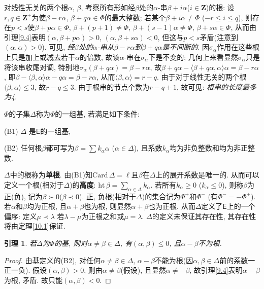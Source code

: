 \documentclass{ctexart}%
\newtheorem{lemma}{引理}
\theoremstyle{definition}
\theoremstyle{remark}
\begin{document}
对线性无关的两个根$\alpha$, $\beta$, 考察所有形如经$\beta$处的$\alpha$-串$\beta+i\alpha$($i\in \mathbf{Z}$)的根: 设$r,q\in \mathbf{Z}^+$为使$\beta-r\alpha$, $\beta+q\alpha\in\Phi$的最大整数; 若某个$\beta+i\alpha\neq \Phi$ ($-r\leq i\leq q$), 则存在$p<s$使$\beta+p\alpha\in\Phi$, $\beta+(p+1)\neq \Phi$, $\beta+(s-1)\alpha\neq \Phi$, $\beta+s\alpha\in\Phi$, 从而由引理\ref{9.4}表明$(\alpha,\beta+p\alpha)>0$, $(\alpha,\beta+s\alpha)<0$, 但这与$p<s$矛盾(注意到$(\alpha,\alpha)>0$). 可见, \emph{经$\beta$处的$\alpha$-串从$\beta-r\alpha$到$\beta+q\alpha$是不间断的}. 因$\sigma_\alpha$作用在这些根上只是加上或减去若干$\alpha$的倍数, 故该$\alpha$-串在$\sigma_\alpha$下是不变的; 几何上来看显然$\sigma_\alpha$只是将该串收尾对调, 特别地$\sigma_\alpha(\beta+q\alpha) = \beta-r\alpha$, 故$\beta+q\alpha-\langle \beta+q\alpha,\alpha\rangle \alpha = \beta-r\alpha$, 即$\beta-\langle \beta,\alpha\rangle \alpha -q\alpha = \beta-r\alpha$, 从而$\langle \beta,\alpha\rangle = r-q$. 由于对于线性无关的两个根$\langle \beta,\alpha\rangle\leq3$, 故$r-q\leq 3$. 由于根串的节点个数为$r-q+1$, 故可见: \emph{根串的长度最多为4}.

$\Phi$的子集$\Delta$称为$\Phi$的一组基, 若满足如下条件:

(B1) $\Delta$ 是$\mathsf{E}$的一组基,

(B2) 任何根$\beta$都可写为$\beta=\sum k_\alpha \alpha$ ($\alpha\in \Delta$), 且系数$k_\alpha$均为非负整数和均为非正整数.

$\Delta$中的根称为\textbf{单根}. 由(B1)知$\mathrm{Card}\,\Delta = \ell$且$\beta$在$\Delta$上的展开系数是唯一的. 从而可以定义一个根(相对于$\Delta$)的\textbf{高度}: $\mathrm{ht}\,\beta = \sum_{\alpha\in\Delta} k_\alpha$. 若所有$k_\alpha \geq0$ ($k_\alpha\leq 0$), 则称$\beta$为正(负), 记为$\beta \succ 0$($\beta\prec 0$). 正, 负根(相对于$\Delta$)的集合记为$\Phi^+$和$\Phi^{-}$ (有$\Phi^-=-\Phi^+$). 若$\alpha$和$\beta$均为正根, 且$\alpha+\beta$也为根, 则显然$\alpha+\beta$也为正根. 从而$\Delta$定义了$\mathsf{E}$上的一个偏序: 定义$\mu\prec \lambda$ 若$\lambda-\mu$为正根之和或$\mu=\lambda$. $\Delta$的定义未保证其存在性, 其存在性将由定理\ref{10.1}保证.
\begin{lemma}\label{10.1l}
若$\Delta$为$\Phi$的基, 则对$\alpha \neq \beta \in \Delta$, 有$(\alpha,\beta)\leq 0$, 且$\alpha-\beta$不为根.
\end{lemma}
\begin{proof}
由基定义的(B2), 对任何$\alpha\neq \beta\in \Delta$, $\alpha-\beta$不能为根(因$\alpha,\beta\in\Delta$前的系数一正一负). 假设$(\alpha,\beta)>0$, 则由$\alpha\neq \beta$(假设), 且显然$\alpha \neq -\beta$, 故引理\ref{9.4}表明$\alpha-\beta$为根, 矛盾. 故只能$(\alpha,\beta)<0$.
\end{proof}
\end{document}
